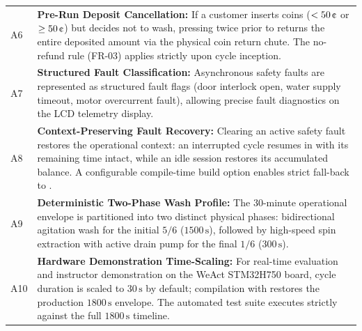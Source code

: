 \begin{longtable}{L{1.0cm}L{13.5cm}}
  A6 & \textbf{Pre-Run Deposit Cancellation:} If a customer inserts coins ($<50\,\text{\textcent}$ or $\ge 50\,\text{\textcent}$) but decides not to wash, pressing  twice prior to  returns the entire deposited amount via the physical coin return chute. The no-refund rule (FR-03) applies strictly upon cycle inception. \\
  A7 & \textbf{Structured Fault Classification:} Asynchronous safety faults are represented as structured fault flags (door interlock open, water supply timeout, motor overcurrent fault), allowing precise fault diagnostics on the LCD telemetry display. \\
  A8 & \textbf{Context-Preserving Fault Recovery:} Clearing an active safety fault restores the operational context: an interrupted cycle resumes in  with its remaining time intact, while an idle session restores its accumulated balance. A configurable compile-time build option enables strict fall-back to . \\
  A9 & \textbf{Deterministic Two-Phase Wash Profile:} The 30-minute operational envelope is partitioned into two distinct physical phases: bidirectional agitation wash for the initial $5/6$ ($1500\,\text{s}$), followed by high-speed spin extraction with active drain pump for the final $1/6$ ($300\,\text{s}$). \\
  A10 & \textbf{Hardware Demonstration Time-Scaling:} For real-time evaluation and instructor demonstration on the WeAct STM32H750 board, cycle duration is scaled to $30\,\text{s}$ by default; compilation with  restores the production $1800\,\text{s}$ envelope. The automated test suite executes strictly against the full $1800\,\text{s}$ timeline. \\
\end{longtable}

